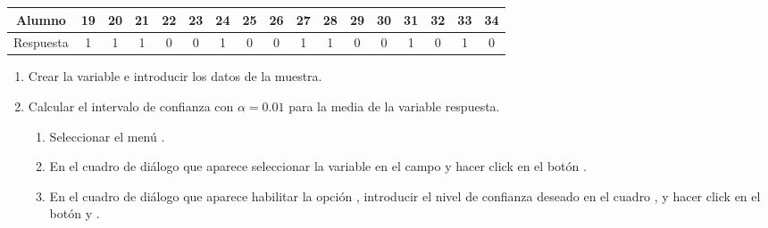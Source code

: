 \begin{enumerate}[leftmargin=*]
\begin{center}
\end{center}

\begin{center}
\begin{tabular}{|l|l|l|l|l|l|l|l|l|l|l|l|l|l|l|l|l|}
\hline
\multicolumn{1}{|c|}{Alumno} & \multicolumn{1}{c|}{19} & \multicolumn{1}{c|}{20} & \multicolumn{1}{c|}{21} & \multicolumn{1}{c|}{22} & \multicolumn{1}{c|}{23} & \multicolumn{1}{c|}{24} & \multicolumn{1}{c|}{25} & \multicolumn{1}{c|}{26} & \multicolumn{1}{c|}{27} & \multicolumn{1}{c|}{28} & \multicolumn{1}{c|}{29} & \multicolumn{1}{c|}{30} & \multicolumn{1}{c|}{31} & \multicolumn{1}{c|}{32} & \multicolumn{1}{c|}{33} & \multicolumn{1}{c|}{34} \\
\hline
\multicolumn{1}{|c|}{Respuesta} & \multicolumn{1}{c|}{1} & \multicolumn{1}{c|}{1} & \multicolumn{1}{c|}{1} & \multicolumn{1}{c|}{0} & \multicolumn{1}{c|}{0} & \multicolumn{1}{c|}{1} & \multicolumn{1}{c|}{0} & \multicolumn{1}{c|}{0} & \multicolumn{1}{c|}{1} & \multicolumn{1}{c|}{1} & \multicolumn{1}{c|}{0} & \multicolumn{1}{c|}{0} & \multicolumn{1}{c|}{1} & \multicolumn{1}{c|}{0} & \multicolumn{1}{c|}{1} & \multicolumn{1}{c|}{0} \\
\hline
\end{tabular}
\end{center}

\begin{enumerate}
\item Crear la variable  e introducir los datos de la muestra.

\item Calcular el intervalo de confianza con $\alpha=0.01$ para la media de la variable respuesta.
\begin{indicacion}
\begin{enumerate}
\item Seleccionar el menú .
\item En el cuadro de diálogo que aparece seleccionar la variable  en el campo
 y hacer click en el botón .
\item En el cuadro de diálogo que aparece habilitar la opción , introducir el nivel
de confianza deseado en el cuadro , y hacer click en el botón
 y .
\end{enumerate}
\end{indicacion}


\end{enumerate}
\end{enumerate}
